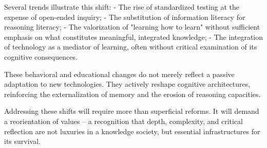 Several trends illustrate this shift: - The rise of standardized testing
at the expense of open-ended inquiry; - The substitution of information
literacy for reasoning literacy; - The valorization of "learning how to
learn" without sufficient emphasis on what constitutes meaningful,
integrated knowledge; - The integration of technology as a mediator of
learning, often without critical examination of its cognitive
consequences.

These behavioral and educational changes do not merely reflect a passive
adaptation to new technologies. They actively reshape cognitive
architectures, reinforcing the externalization of memory and the erosion
of reasoning capacities.

Addressing these shifts will require more than superficial reforms. It
will demand a reorientation of values -- a recognition that depth,
complexity, and critical reflection are not luxuries in a knowledge
society, but essential infrastructures for its survival.

